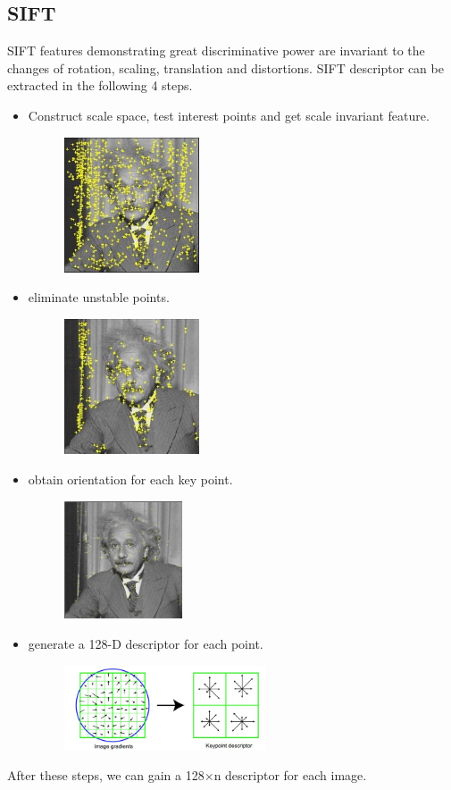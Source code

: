 \documentclass{acm_proc_article-sp}
\begin{document}
\subsection{SIFT}
SIFT features demonstrating great discriminative power are invariant to the changes of rotation, scaling, translation and distortions. SIFT descriptor can be extracted in the following 4 steps.
\begin{itemize}
\item Construct scale space, test interest points and get scale invariant feature.
\begin{figure}[h]
\centering
\includegraphics[height=4cm ,width=4cm,angle=0]{sift1.jpg}
\end{figure}

\item eliminate unstable points.
\begin{figure}[h]
\centering
\includegraphics[height=4cm ,width=4cm,angle=0]{sift2.jpg}
\end{figure}

\item obtain orientation for each key point.
\begin{figure}[h]
\centering
\includegraphics[height=3.5cm ,width=3.5cm,angle=0]{sift3.jpg}
\end{figure}

\item generate a 128-D descriptor for each point.
\begin{figure}[h]
\centering
\includegraphics[height=2.5cm ,width=6cm,angle=0]{sift4.jpg}
\end{figure}
\end{itemize}
After these steps, we can gain a 128$\times$n descriptor for each image.
\end{document}
